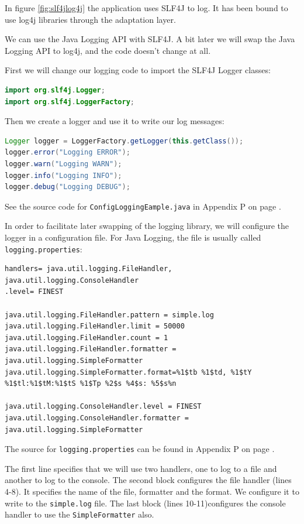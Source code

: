 In figure \ref{fig:slf4jlog4j} the application uses SLF4J to log. It has been bound to use log4j libraries through the adaptation layer. 

We can use the Java Logging API with SLF4J. A bit later we will swap the Java Logging API to log4j, and the code doesn't change at all.

First we will change our logging code to import the SLF4J Logger classes:
\begin{lstlisting}[language=Java]
import org.slf4j.Logger;
import org.slf4j.LoggerFactory;
\end{lstlisting}

Then we create a logger and use it to write our log messages:
\begin{lstlisting}[language=Java]
Logger logger = LoggerFactory.getLogger(this.getClass());
logger.error("Logging ERROR");
logger.warn("Logging WARN");
logger.info("Logging INFO");
logger.debug("Logging DEBUG");
\end{lstlisting}

See the source code for \texttt{ConfigLoggingEample.java} in Appendix P on page \pageref{App:AppendixP}.

In order to facilitate later swapping of the logging library, we will configure the logger in a configuration file. For Java Logging, the file is usually called \texttt{logging.properties}:
\begin{lstlisting}
handlers= java.util.logging.FileHandler, java.util.logging.ConsoleHandler
.level= FINEST

java.util.logging.FileHandler.pattern = simple.log
java.util.logging.FileHandler.limit = 50000
java.util.logging.FileHandler.count = 1
java.util.logging.FileHandler.formatter = java.util.logging.SimpleFormatter
java.util.logging.SimpleFormatter.format=%1$tb %1$td, %1$tY %1$tl:%1$tM:%1$tS %1$Tp %2$s %4$s: %5$s%n

java.util.logging.ConsoleHandler.level = FINEST
java.util.logging.ConsoleHandler.formatter = java.util.logging.SimpleFormatter
\end{lstlisting}

The source for \texttt{logging.properties} can be found in Appendix P on page \pageref{App:AppendixP}.

The first line specifies that we will use two handlers, one to log to a file and another to log to the console. The second block configures the file handler (lines 4-8). It specifies the name of the file, formatter and the format. We configure it to write to the \texttt{simple.log} file. The last block (lines 10-11)configures the console handler to use the \texttt{SimpleFormatter} also.

